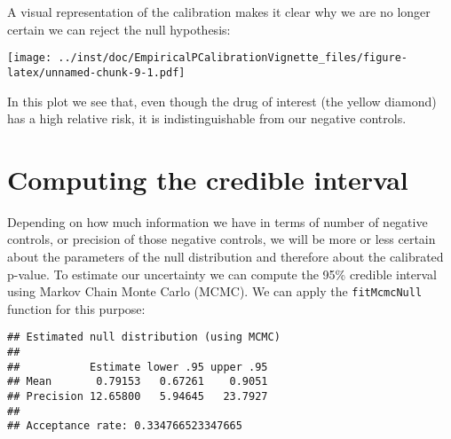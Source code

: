 \documentclass[
]{article}
\newenvironment{Shaded}{\begin{snugshade}}{\end{snugshade}}
\newcommand{\KeywordTok}[1]{\textcolor[rgb]{0.13,0.29,0.53}{\textbf{#1}}}
\newcommand{\NormalTok}[1]{#1}
\newcommand{\OperatorTok}[1]{\textcolor[rgb]{0.81,0.36,0.00}{\textbf{#1}}}
\newcommand{\StringTok}[1]{\textcolor[rgb]{0.31,0.60,0.02}{#1}}
\begin{document}
A visual representation of the calibration makes it clear why we are no
longer certain we can reject the null hypothesis:

\begin{Shaded}
\end{Shaded}

\texttt{[image: ../inst/doc/EmpiricalPCalibrationVignette\_files/figure-latex/unnamed-chunk-9-1.pdf]}

In this plot we see that, even though the drug of interest (the yellow
diamond) has a high relative risk, it is indistinguishable from our
negative controls.

\hypertarget{computing-the-credible-interval}{%
\section{Computing the credible
interval}\label{computing-the-credible-interval}}

Depending on how much information we have in terms of number of negative
controls, or precision of those negative controls, we will be more or
less certain about the parameters of the null distribution and therefore
about the calibrated p-value. To estimate our uncertainty we can compute
the 95\% credible interval using Markov Chain Monte Carlo (MCMC). We can
apply the \texttt{fitMcmcNull} function for this purpose:

\begin{Shaded}
\end{Shaded}

\begin{verbatim}
## Estimated null distribution (using MCMC)
## 
##           Estimate lower .95 upper .95
## Mean       0.79153   0.67261    0.9051
## Precision 12.65800   5.94645   23.7927
## 
## Acceptance rate: 0.334766523347665
\end{verbatim}
\end{document}
